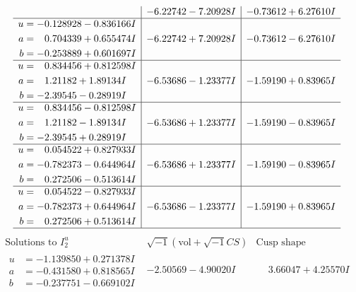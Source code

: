 \documentclass[1p]{elsarticle_modified}
\theoremstyle{definition}
\newcommand{\I}{\sqrt{-1}}
\begin{document}
$$\begin{array}{c|c|c}
 & -6.22742 - 7.20928 I & -0.73612 + 6.27610 I \\ \hline\begin{aligned}
u &= -0.128928 - 0.836166 I \\
a &= \phantom{-}0.704339 + 0.655474 I \\
b &= -0.253889 + 0.601697 I\end{aligned}
 & -6.22742 + 7.20928 I & -0.73612 - 6.27610 I \\ \hline\begin{aligned}
u &= \phantom{-}0.834456 + 0.812598 I \\
a &= \phantom{-}1.21182 + 1.89134 I \\
b &= -2.39545 - 0.28919 I\end{aligned}
 & -6.53686 - 1.23377 I & -1.59190 + 0.83965 I \\ \hline\begin{aligned}
u &= \phantom{-}0.834456 - 0.812598 I \\
a &= \phantom{-}1.21182 - 1.89134 I \\
b &= -2.39545 + 0.28919 I\end{aligned}
 & -6.53686 + 1.23377 I & -1.59190 - 0.83965 I \\ \hline\begin{aligned}
u &= \phantom{-}0.054522 + 0.827933 I \\
a &= -0.782373 - 0.644964 I \\
b &= \phantom{-}0.272506 - 0.513614 I\end{aligned}
 & -6.53686 + 1.23377 I & -1.59190 - 0.83965 I \\ \hline\begin{aligned}
u &= \phantom{-}0.054522 - 0.827933 I \\
a &= -0.782373 + 0.644964 I \\
b &= \phantom{-}0.272506 + 0.513614 I\end{aligned}
 & -6.53686 - 1.23377 I & -1.59190 + 0.83965 I\\
 \hline 
 \end{array}$$\newpage$$\begin{array}{c|c|c}  
\text{Solutions to }I^u_{2}& \I (\text{vol} + \sqrt{-1}CS) & \text{Cusp shape}\\
 \hline 
\begin{aligned}
u &= -1.139850 + 0.271378 I \\
a &= -0.431580 + 0.818565 I \\
b &= -0.237751 - 0.669102 I\end{aligned}
 & -2.50569 - 4.90020 I & \phantom{-}3.66047 + 4.25570 I \\ \hline\begin{aligned}

\end{aligned}
\end{array}$$
\end{document}

